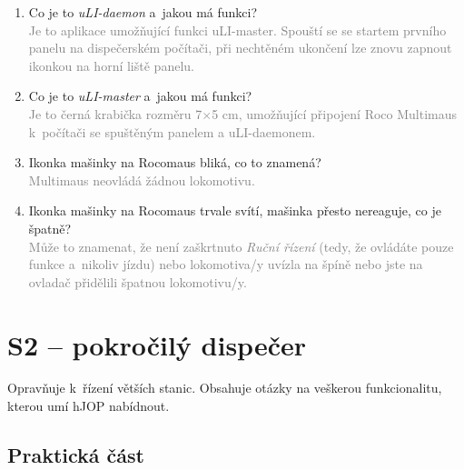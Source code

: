 \documentclass[12pt,a4paper]{article}
\newcommand{\solution}[1]{\\ \textcolor{gray}{#1}}
\newcommand{\solution}[1]{}
\begin{document}
\begin{enumerate}[leftmargin=*]

\item Co je to \textit{uLI-daemon} a~jakou má funkci?
\solution{Je to aplikace umožňující funkci uLI-master. Spouští se se startem
prvního panelu na dispečerském počítači, při nechtěném ukončení lze znovu
zapnout ikonkou na horní liště panelu.}

\item Co je to \textit{uLI-master} a~jakou má funkci?
\solution{Je to černá krabička rozměru 7×5 cm, umožňující připojení Roco
Multimaus k~počítači se spuštěným panelem a uLI-daemonem.}

\item Ikonka mašinky na Rocomaus bliká, co to znamená?
\solution{Multimaus neovládá žádnou lokomotivu.}

\item Ikonka mašinky na Rocomaus trvale svítí, mašinka přesto nereaguje,
co je špatně?
\solution{Může to znamenat, že není zaškrtnuto \textit{Ruční řízení} (tedy, že
ovládáte pouze funkce a~nikoliv jízdu) nebo lokomotiva/y uvízla na špíně nebo
jste na ovladač přidělili špatnou lokomotivu/y.}

\end{enumerate}


\newpage
\section{S2 – pokročilý dispečer}

Opravňuje k~řízení větších stanic. Obsahuje otázky na veškerou funkcionalitu,
kterou umí hJOP nabídnout.

\subsection{Praktická část}
\end{document}
